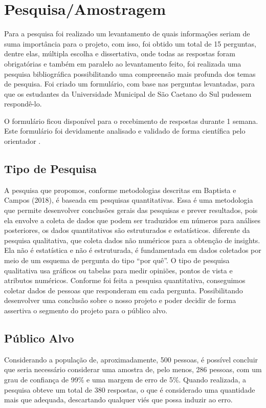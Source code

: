 % 

\chapter[Pesquisa/Amostragem]{Pesquisa/Amostragem}

Para a pesquisa foi realizado um levantamento de quais informações seriam de suma importância para o projeto, com isso, foi obtido um total de 15 perguntas, dentre elas, múltipla escolha e dissertativa, onde todas as respostas foram obrigatórias e também em paralelo ao levantamento feito, foi realizada uma pesquisa bibliográfica possibilitando uma compreensão mais profunda dos temas de pesquisa. Foi criado um formulário, com base nas perguntas levantadas, para que os estudantes da Universidade Municipal de São Caetano do Sul pudessem respondê-lo. 

O formulário ficou disponível para o recebimento de respostas durante 1 semana. Este formulário foi devidamente analisado e validado de forma científica pelo orientador \imprimirorientador.

\section{Tipo de Pesquisa}
A pesquisa que propomos, conforme metodologias descritas em Baptista e Campos (2018), é baseada em pesquisas quantitativas. Essa é uma metodologia que permite desenvolver conclusões gerais das pesquisas e prever resultados, pois ela envolve a coleta de dados que podem ser traduzidos em números para análises posteriores, os dados quantitativos são estruturados e estatísticos. diferente da pesquisa qualitativa, que coleta dados não numéricos para a obtenção de insights. Ela não é estatística e não é estruturada, é fundamentada em dados coletados por meio de um esquema de pergunta do tipo “por quê”. O tipo de pesquisa qualitativa usa gráficos ou tabelas para medir opiniões, pontos de vista e atributos numéricos.
Conforme foi feita a pesquisa quantitativa, conseguimos coletar dados de pessoas que responderam em cada pergunta. Possibilitando desenvolver uma conclusão sobre o nosso projeto e poder decidir de forma assertiva o segmento do projeto para o público alvo.

\section{Público Alvo}
Considerando a população de, aproximadamente, 500 pessoas, é possível concluir que seria necessário considerar uma amostra de, pelo menos, 286 pessoas, com um grau de confiança de 99\% e uma margem de erro de 5\%. Quando realizada, a pesquisa obteve um total de 380 respostas, o que é considerado uma quantidade mais que adequada, descartando qualquer viés que possa induzir ao erro.

